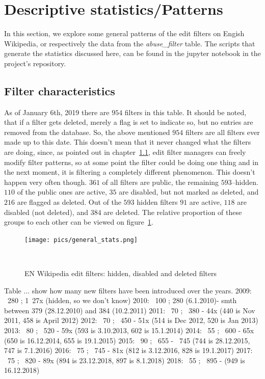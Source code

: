 \section{Descriptive statistics/Patterns}
\label{sec:patterns}

In this section, we explore some general patterns of the edit filters on Engish Wikipedia, or respectively the data from the \emph{abuse\_filter} table.
The scripts that generate the statistics discussed here, can be found in the jupyter notebook in the project's repository. %

\subsection{Filter characteristics}
As of January 6th, 2019 there are $954$ filters in this table.
It should be noted, that if a filter gets deleted, merely a flag is set to indicate so, but no entries are removed from the database.
So, the above mentioned $954$ filters are all filters ever made up to this date.
This doesn't mean that it never changed what the filters are doing, since, as pointed out in chapter~\ref{}, edit filter managers can freely modify filter patterns, so at some point the filter could be doing one thing and in the next moment, it is filtering a completely different phenomenon.
This doesn't happen very often though.
$361$ of all filters are public, the remaining $593$–hidden.
$110$ of the public ones are active, $35$ are disabled, but not marked as deleted, and $216$ are flagged as deleted.
Out of the $593$ hidden filters $91$ are active, $118$ are disabled (not deleted), and $384$ are deleted.
The relative proportion of these groups to each other can be viewed on figure~\ref{fig:general-stats}.

\begin{figure}
\centering
  \texttt{[image: pics/general\_stats.png]}
  \caption{EN Wikipedia edit filters: hidden, disabled and deleted filters}~\label{fig:general-stats}
\end{figure}

Table ... show how many new filters have been introduced over the years.
2009: ~280 ; 1~27x (hidden, so we don't know)
2010: ~100 ; 280 (6.1.2010)- smth between 379 (28.12.2010) and 384 (10.2.2011)
2011: ~70  ; ~380 - 44x (440 is Nov 2011, 458 is April 2012)
2012: ~70  ; ~450 - 51x (514 is Dec 2012, 520 is Jan 2013)
2013: ~80  ; ~520 - 59x (593 is 3.10.2013, 602 is 15.1.2014)
2014: ~55  ; ~600 - 65x (650 is 16.12.2014, 655 is 19.1.2015)
2015: ~90  ; ~655 - ~745 (744 is 28.12.2015, 747 is 7.1.2016)
2016: ~75  ; ~745 - 81x (812 is 3.12.2016, 828 is 19.1.2017)
2017: ~75  ; ~820 - 89x (894 is 23.12.2018, 897 is 8.1.2018)
2018: ~55  ; ~895 - (949 is 16.12.2018)


